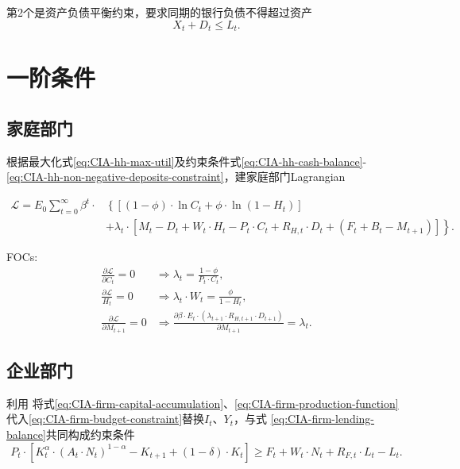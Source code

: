 第2个是资产负债平衡约束，要求同期的银行负债不得超过资产
\begin{equation}
  \label{eq:CIA-bank-balance-sheet}
  X_t + D_t \le L_t.
\end{equation}

\section{一阶条件}
\subsection{家庭部门}
根据最大化式\eqref{eq:CIA-hh-max-util}及约束条件式\eqref{eq:CIA-hh-cash-balance}-\eqref{eq:CIA-hh-non-negative-deposits-constraint}，建家庭部门Lagrangian

\begin{align*}
  \mathcal{L} = E_0 \sum_{t=0}^{\infty} \beta^t \cdot & \left\{
\left[(1-\phi) \cdot \ln C_t + \phi \cdot \ln (1-H_t)\right]
   \right. \\
   & \left. + \lambda_t \cdot
   \left[
M_t - D_t + W_t \cdot H_t - P_t \cdot C_t + R_{H,t} \cdot D_t + \left( F_t + B_t - M_{t+1} \right)
   \right]\right\}.
\end{align*}

FOCs:
\begin{align}
  \label{eq:CIA-hh-FOC-C}
  \frac{\partial \mathcal{L}}{\partial C_t} = 0 &\Rightarrow \lambda_t = \frac{1-\phi}{P_t \cdot C_t}, \\
  \label{eq:CIA-hh-FOC-H}
  \frac{\partial \mathcal{L}}{H_t}=0 &\Rightarrow \lambda_t \cdot W_t = \frac{\phi}{1-H_t},\\
  \label{eq:CIA-hh-FOC-M}
  \frac{\partial \mathcal{L}}{\partial M_{t+1}} = 0 &\Rightarrow \frac{\partial \beta \cdot E_t \cdot \left( \lambda_{t+1} \cdot R_{H,t+1} \cdot D_{t+1} \right)}{\partial M_{t+1}} = \lambda_t.
\end{align}

\subsection{企业部门}
利用
将式\eqref{eq:CIA-firm-capital-accumulation}、\eqref{eq:CIA-firm-production-function}
代入\eqref{eq:CIA-firm-budget-constraint}替换$I_t$、$Y_t$，与式  \eqref{eq:CIA-firm-lending-balance}共同构成约束条件
\begin{equation*}
  P_t \cdot \left[
K_t^{\alpha} \cdot \left(A_t \cdot N_t \right)^{1-\alpha} - K_{t+1} + (1-\delta) \cdot K_t
  \right] \ge F_t + W_t \cdot N_t + R_{F,t} \cdot L_t - L_t.
\end{equation*}

